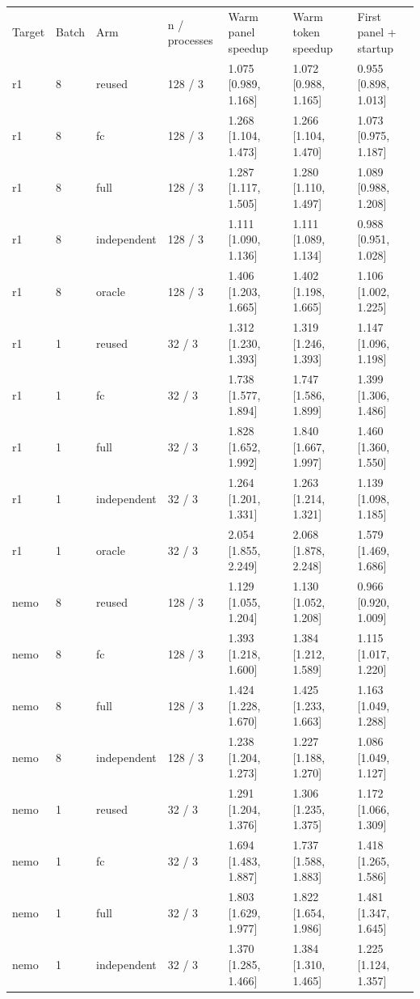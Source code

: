 \begin{tabular}{lllllll}
Target & Batch & Arm & n / processes & Warm panel speedup & Warm token speedup & First panel + startup \\
r1 & 8 & reused & 128 / 3 & 1.075 [0.989, 1.168] & 1.072 [0.988, 1.165] & 0.955 [0.898, 1.013] \\
r1 & 8 & fc & 128 / 3 & 1.268 [1.104, 1.473] & 1.266 [1.104, 1.470] & 1.073 [0.975, 1.187] \\
r1 & 8 & full & 128 / 3 & 1.287 [1.117, 1.505] & 1.280 [1.110, 1.497] & 1.089 [0.988, 1.208] \\
r1 & 8 & independent & 128 / 3 & 1.111 [1.090, 1.136] & 1.111 [1.089, 1.134] & 0.988 [0.951, 1.028] \\
r1 & 8 & oracle & 128 / 3 & 1.406 [1.203, 1.665] & 1.402 [1.198, 1.665] & 1.106 [1.002, 1.225] \\
r1 & 1 & reused & 32 / 3 & 1.312 [1.230, 1.393] & 1.319 [1.246, 1.393] & 1.147 [1.096, 1.198] \\
r1 & 1 & fc & 32 / 3 & 1.738 [1.577, 1.894] & 1.747 [1.586, 1.899] & 1.399 [1.306, 1.486] \\
r1 & 1 & full & 32 / 3 & 1.828 [1.652, 1.992] & 1.840 [1.667, 1.997] & 1.460 [1.360, 1.550] \\
r1 & 1 & independent & 32 / 3 & 1.264 [1.201, 1.331] & 1.263 [1.214, 1.321] & 1.139 [1.098, 1.185] \\
r1 & 1 & oracle & 32 / 3 & 2.054 [1.855, 2.249] & 2.068 [1.878, 2.248] & 1.579 [1.469, 1.686] \\
nemo & 8 & reused & 128 / 3 & 1.129 [1.055, 1.204] & 1.130 [1.052, 1.208] & 0.966 [0.920, 1.009] \\
nemo & 8 & fc & 128 / 3 & 1.393 [1.218, 1.600] & 1.384 [1.212, 1.589] & 1.115 [1.017, 1.220] \\
nemo & 8 & full & 128 / 3 & 1.424 [1.228, 1.670] & 1.425 [1.233, 1.663] & 1.163 [1.049, 1.288] \\
nemo & 8 & independent & 128 / 3 & 1.238 [1.204, 1.273] & 1.227 [1.188, 1.270] & 1.086 [1.049, 1.127] \\
nemo & 1 & reused & 32 / 3 & 1.291 [1.204, 1.376] & 1.306 [1.235, 1.375] & 1.172 [1.066, 1.309] \\
nemo & 1 & fc & 32 / 3 & 1.694 [1.483, 1.887] & 1.737 [1.588, 1.883] & 1.418 [1.265, 1.586] \\
nemo & 1 & full & 32 / 3 & 1.803 [1.629, 1.977] & 1.822 [1.654, 1.986] & 1.481 [1.347, 1.645] \\
nemo & 1 & independent & 32 / 3 & 1.370 [1.285, 1.466] & 1.384 [1.310, 1.465] & 1.225 [1.124, 1.357] \\
\end{tabular}
